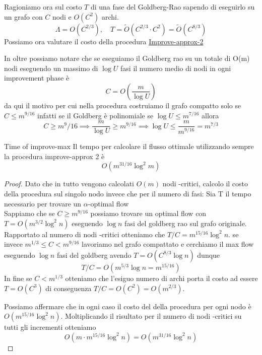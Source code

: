 Ragioniamo ora sul costo $T$ di una fase del Goldberg-Rao sapendo di eseguirlo su un grafo con $C$ nodi e $O(C^2)$ archi.
\[ \Lambda = O(C^{2/3}),\quad T = \tilde O(C^{2/3}\cdot C^2) =\tilde O(C^{8/3})\]
Possiamo ora valutare il costo della procedura \hyperref[imp2]{Improve-approx-2} 

In oltre possiamo notare che se eseguiamo il Goldberg rao su un totale di O(m) nodi eseguendo un massimo di $\log U$ fasi il numero medio di nodi in ogni improvement phase è
\[C = O\left (\frac{m}{\log{U}}\right )\]
da qui il motivo per cui nella procedura costruiamo il grafo compatto solo se $C \le m^{9/16}$ infatti se il Goldberg è polinomiale se $\log U \le m^{7/16}$ allora 
\[C\ge m^9/16 \implies \frac{m}{\log U}\ge m^{9/16} \implies \log U \le \frac{m}{m^{9/16}} = m^{7/3}\]

\begin{lemma}{Time of improve-max}{}
    Il tempo per calcolare il flusso ottimale utilizzando sempre la procedura improve-approx 2 è 
    \[O(m^{31/16}\log^2m)\]
\end{lemma}
\begin{proof}
Dato che in tutto vengono calcolati $O(m)$ nodi \gmm-critici, calcolo il costo della procedura sul singolo nodo invece che per il numero di fasi:
Sia T il tempo necessario per trovare un $\alpha$-optimal flow\\
Sappiamo che se $C \ge m^{9/16}$ possiamo trovare un optimal flow con $T = O(m^{3/2}\log^2 n)$ eseguendo $\log n$ fasi del goldberg rao sul grafo originale. Rapportato al numero di nodi \gmm-critici otteniamo che $T/C = m^{15/16}\log^2n$. 
se invece $ m^{1/3} \le C < m^{9/16}$ lavoriamo nel grafo compattato e cerchiamo il max flow eseguendo $\log n$ fasi del goldberg avendo $T = O(C^{8/3} \log n)$ dunque \[T/C = O(m^{5/3}\log n = m^{15/16})\]
In fine se $C < m^{1/3}$ otteniamo che l'esiguo numero di archi porta il costo ad essere $ T= O(C^3)$ di conseguenza $T/C = O(C^2) = O(m^{2/3})$.

Possiamo affermare che in ogni caso il costo del della procedura per ogni nodo è $O(m^{15/16}\log^2n)$. Moltiplicando il risultato per il numero di nodi \gmm-critici su tutti gli incrementi otteniamo \[O(m\cdot m^{15/16}\log^2n) = O(m^{31/16}\log^2n)\] 
\QED
\end{proof}

